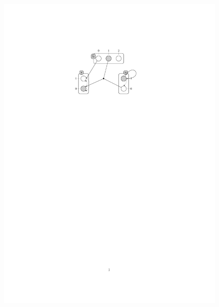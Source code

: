 \begin{figure}[htb!]
\begin{minipage}[t]{0.4\linewidth}
\includegraphics[width =1\linewidth]{images/PH-but.pdf}
\end{minipage}

\end{figure}